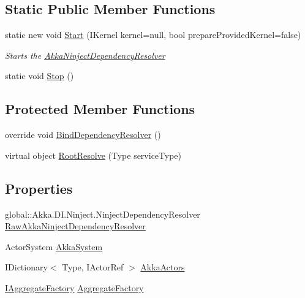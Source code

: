 \subsection*{Static Public Member Functions}
\begin{DoxyCompactItemize}
\item 
static new void \hyperlink{classCqrs_1_1Ninject_1_1Akka_1_1AkkaNinjectDependencyResolver_afedf5f178be776a0f89d7d12c63326c7}{Start} (I\+Kernel kernel=null, bool prepare\+Provided\+Kernel=false)
\begin{DoxyCompactList}\small\item\em Starts the \hyperlink{classCqrs_1_1Ninject_1_1Akka_1_1AkkaNinjectDependencyResolver}{Akka\+Ninject\+Dependency\+Resolver} \end{DoxyCompactList}\item 
static void \hyperlink{classCqrs_1_1Ninject_1_1Akka_1_1AkkaNinjectDependencyResolver_a605f605b38b49b8d0e00695983f85bf6}{Stop} ()
\end{DoxyCompactItemize}
\subsection*{Protected Member Functions}
\begin{DoxyCompactItemize}
\item 
override void \hyperlink{classCqrs_1_1Ninject_1_1Akka_1_1AkkaNinjectDependencyResolver_ab7ba3c0a331d115073b5118673984507}{Bind\+Dependency\+Resolver} ()
\item 
virtual object \hyperlink{classCqrs_1_1Ninject_1_1Akka_1_1AkkaNinjectDependencyResolver_a01f8088b8081ccaad65c1c6be36f7b65}{Root\+Resolve} (Type service\+Type)
\end{DoxyCompactItemize}
\subsection*{Properties}
\begin{DoxyCompactItemize}
\item 
global\+::\+Akka.\+D\+I.\+Ninject.\+Ninject\+Dependency\+Resolver \hyperlink{classCqrs_1_1Ninject_1_1Akka_1_1AkkaNinjectDependencyResolver_a08c93ce2f3f66affd8753eb3d3de1211}{Raw\+Akka\+Ninject\+Dependency\+Resolver}
\item 
Actor\+System \hyperlink{classCqrs_1_1Ninject_1_1Akka_1_1AkkaNinjectDependencyResolver_a3de5415a68020e868579491453621f64}{Akka\+System}
\item 
I\+Dictionary$<$ Type, I\+Actor\+Ref $>$ \hyperlink{classCqrs_1_1Ninject_1_1Akka_1_1AkkaNinjectDependencyResolver_acfe6512df9f871fa148fbf0866b3ba52}{Akka\+Actors}
\item 
\hyperlink{interfaceCqrs_1_1Domain_1_1Factories_1_1IAggregateFactory}{I\+Aggregate\+Factory} \hyperlink{classCqrs_1_1Ninject_1_1Akka_1_1AkkaNinjectDependencyResolver_afc2288a9aac598943df2a995b660d859}{Aggregate\+Factory}
\end{DoxyCompactItemize}
